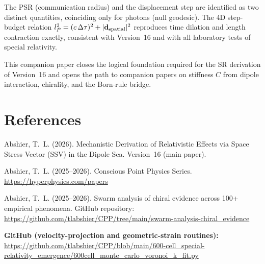 \documentclass[12pt]{article}
\begin{document}
The PSR (communication radius) and the displacement step are identified as
two distinct quantities, coinciding only for photons (null geodesic).  The
4D step-budget relation $l_P^2 = (c\,\Delta\tau)^2 + |\mathbf{d}_{\rm
spatial}|^2$ reproduces time dilation and length contraction exactly,
consistent with Version~16 and with all laboratory tests of special
relativity.

This companion paper closes the logical foundation required for the SR
derivation of Version~16 and opens the path to companion papers on stiffness
$C$ from dipole interaction, chirality, and the Born-rule bridge.

\section*{References}

\begin{enumerate}[label={[\arabic*]}]
  \item Abshier, T.~L. (2026).
    Mechanistic Derivation of Relativistic Effects via Space Stress Vector
    (SSV) in the Dipole Sea.  Version~16 (main paper).

  \item Abshier, T.~L. (2025--2026).
    Conscious Point Physics Series.
    \url{https://hyperphysics.com/papers}

  \item Abshier, T.~L. (2025--2026).
    Swarm analysis of chiral evidence across 100+ empirical phenomena.
    GitHub repository:
    \url{https://github.com/tlabshier/CPP/tree/main/swarm-analysis-chiral_evidence}
\end{enumerate}

\bigskip
\noindent\textbf{GitHub (velocity-projection and geometric-strain routines):}\\
\url{https://github.com/tlabshier/CPP/blob/main/600-cell_special-relativity_emergence/600cell_monte_carlo_voronoi_k_fit.py}
\end{document}
